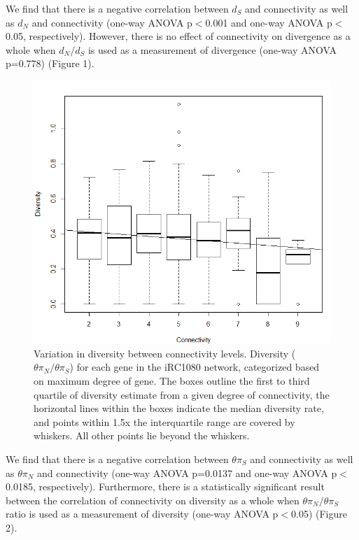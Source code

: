 \documentclass[letterpaper, 10 pt, conference]{ieeeconf}  %
\begin{document}
\setlength{\parindent}{10ex} We find that there is a negative correlation between $d_S$ and connectivity as well as $d_N$ and connectivity (one-way ANOVA p$<$0.001 and one-way ANOVA p$<$0.05, respectively). However, there is no effect of connectivity on divergence as a whole when $d_N/d_S$ is used as a measurement of divergence (one-way ANOVA p=0.778) (Figure 1).
 \begin{figure}[thpb]
      \centering


      \includegraphics[scale=0.44]{FINAL_DIVERSITY_PLOT.png}
      \caption
      {\fontsize{8}{11}\selectfont Variation in diversity between connectivity levels. Diversity ($\theta \pi_N/\theta \pi_S$) for each gene in the iRC1080 network, categorized based on maximum degree of gene. The boxes outline the first to third quartile of diversity estimate from a given degree of connectivity, the horizontal lines within the boxes indicate the median diversity rate, and points within 1.5x the interquartile range are covered by whiskers. All other points lie beyond the whiskers. }
   \end{figure}   

\setlength{\parindent}{10ex} We find that there is a negative correlation between $\theta \pi_S$ and connectivity as well as $\theta \pi_N$ and connectivity (one-way ANOVA p=0.0137 and one-way ANOVA p$<$0.0185, respectively). Furthermore, there is a statistically significant result between the correlation of connectivity on diversity as a whole when $\theta \pi_N/\theta \pi_S$ ratio is used as a measurement of diversity (one-way ANOVA p$<$0.05) (Figure 2).
\end{document}
